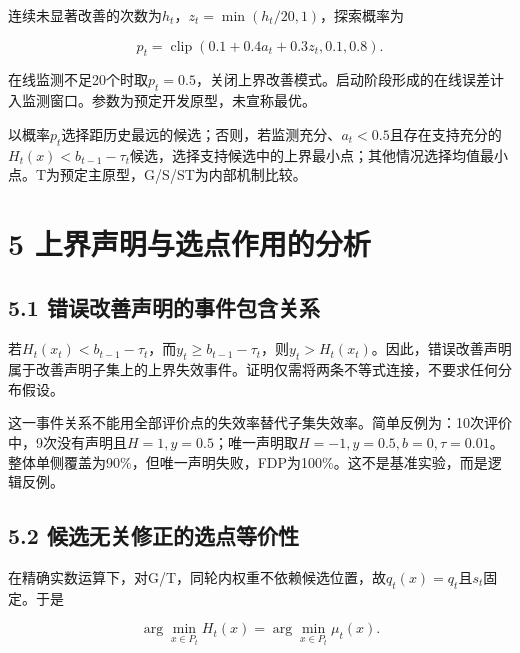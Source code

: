 \documentclass[11pt,a4paper]{article}
\begin{document}
\par\noindent\begin{minipage}{\linewidth}

连续未显著改善的次数为\(h_t\)，\(z_t=\min(h_t/20,1)\)，探索概率为

\[
p_t=\operatorname{clip}(0.1+0.4a_t+0.3z_t,0.1,0.8).
\]

\end{minipage}\par

在线监测不足20个时取\(p_t=0.5\)，关闭上界改善模式。启动阶段形成的在线误差计入监测窗口。参数为预定开发原型，未宣称最优。

以概率\(p_t\)选择距历史最远的候选；否则，若监测充分、\(a_t<0.5\)且存在支持充分的\(H_t(x)<b_{t-1}-\tau_t\)候选，选择支持候选中的上界最小点；其他情况选择均值最小点。T为预定主原型，G/S/ST为内部机制比较。

\hypertarget{ux4e0aux754cux58f0ux660eux4e0eux9009ux70b9ux4f5cux7528ux7684ux5206ux6790}{%
\section{5
上界声明与选点作用的分析}\label{ux4e0aux754cux58f0ux660eux4e0eux9009ux70b9ux4f5cux7528ux7684ux5206ux6790}}

\hypertarget{ux9519ux8befux6539ux5584ux58f0ux660eux7684ux4e8bux4ef6ux5305ux542bux5173ux7cfb}{%
\subsection{5.1
错误改善声明的事件包含关系}\label{ux9519ux8befux6539ux5584ux58f0ux660eux7684ux4e8bux4ef6ux5305ux542bux5173ux7cfb}}

若\(H_t(x_t)<b_{t-1}-\tau_t\)，而\(y_t\ge b_{t-1}-\tau_t\)，则\(y_t>H_t(x_t)\)。因此，错误改善声明属于改善声明子集上的上界失效事件。证明仅需将两条不等式连接，不要求任何分布假设。

这一事件关系不能用全部评价点的失效率替代子集失效率。简单反例为：10次评价中，9次没有声明且\(H=1,y=0.5\)；唯一声明取\(H=-1,y=0.5,b=0,\tau=0.01\)。整体单侧覆盖为90\%，但唯一声明失败，FDP为100\%。这不是基准实验，而是逻辑反例。

\par{}\noindent\begin{minipage}{\linewidth}

\hypertarget{ux5019ux9009ux65e0ux5173ux4feeux6b63ux7684ux9009ux70b9ux7b49ux4ef7ux6027}{%
\subsection{5.2
候选无关修正的选点等价性}\label{ux5019ux9009ux65e0ux5173ux4feeux6b63ux7684ux9009ux70b9ux7b49ux4ef7ux6027}}

在精确实数运算下，对G/T，同轮内权重不依赖候选位置，故\(q_t(x)=q_t\)且\(s_t\)固定。于是

\[
\arg\min_{x\in P_t} H_t(x)=\arg\min_{x\in P_t}\mu_t(x).
\]

\end{minipage}\par
\end{document}
